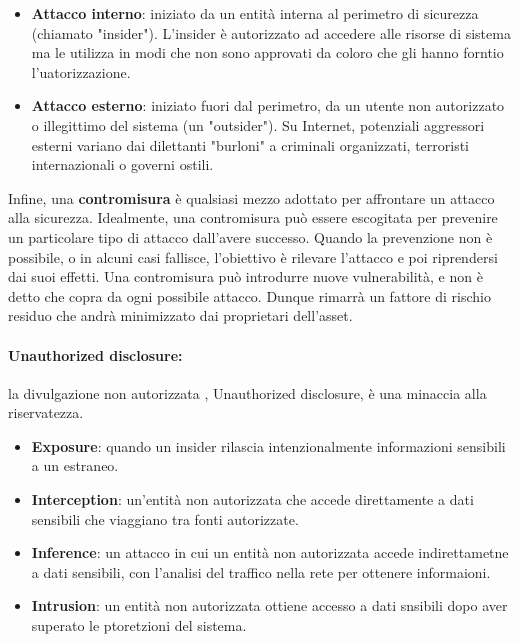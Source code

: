\begin{itemize}
    \item \textbf{Attacco interno}: iniziato da un entità interna al perimetro
          di sicurezza (chiamato "insider"). L'insider è autorizzato ad accedere alle
          risorse di sistema ma le utilizza in modi che non sono approvati da coloro che
          gli hanno forntio l'uatorizzazione.
    \item \textbf{Attacco esterno}: iniziato fuori dal perimetro, da un utente
          non autorizzato o illegittimo del sistema (un "outsider").
          Su Internet, potenziali aggressori esterni variano dai dilettanti "burloni"
          a criminali organizzati, terroristi internazionali o governi ostili. %
\end{itemize}

Infine, una \textbf{contromisura} è qualsiasi mezzo adottato per affrontare un
attacco alla sicurezza. Idealmente, una contromisura può essere escogitata per
prevenire un particolare tipo di attacco dall'avere successo.
Quando la prevenzione non è possibile, o in alcuni casi fallisce, l'obiettivo è
rilevare l'attacco e poi riprendersi dai suoi effetti. Una contromisura
può introdurre nuove vulnerabilità, e non è detto che copra da ogni possibile
attacco. Dunque rimarrà un fattore di rischio residuo che andrà minimizzato dai
proprietari dell'asset.

\paragraph{Unauthorized disclosure:} la divulgazione non autorizzata
, Unauthorized disclosure, è una minaccia alla riservatezza.

\begin{itemize}
    \item \textbf{Exposure}: quando un insider rilascia intenzionalmente
          informazioni sensibili a un estraneo.
    \item \textbf{Interception}: un'entità non autorizzata che accede
          direttamente a dati sensibili che viaggiano tra fonti autorizzate.
    \item \textbf{Inference}: un attacco in cui un entità non autorizzata
          accede indirettametne a dati sensibili, con l'analisi del traffico nella rete
          per ottenere informaioni.
    \item \textbf{Intrusion}: un entità non autorizzata ottiene accesso a dati
          snsibili dopo aver superato le ptoretzioni del sistema.
\end{itemize}

